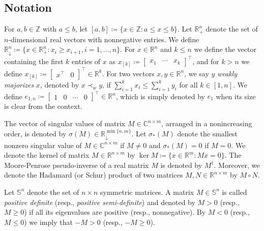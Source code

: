 \documentclass[pdflatex,sn-mathphys-num]{sn-jnl}%
\theoremstyle{thmstyleone}
\begin{document}
\subsection{Notation}


For $a,b\in\mathbb{Z}$ with $a\leq b$, let $[a,b]\coloneqq\{x\in\mathbb{Z}:a\leq x\leq b\}$. Let $\mathbb{R}_+^n$ denote the set of $n$-dimensional real vectors with nonnegative entries. We define \linebreak $\mathbb{R}^n_{\downarrow}\coloneqq\{x\in\mathbb{R}_+^n:x_i\geq x_{i+1},i=1,\ldots,n\}$. For $x\in\mathbb{R}^n$ and $k\leq n$ we define the vector containing the first $k$ entries of $x$ as $x_{[k]}\coloneqq\begin{bmatrix}
x_1 & \cdots & x_k
\end{bmatrix}^\top$, and for $k>n$ we define $x_{[k]}\coloneqq\begin{bmatrix}
x^\top & 0
\end{bmatrix}^\top\in\mathbb{R}^k$. For two vectors $x,y\in\mathbb{R}^n$, we say $y$ \emph{weakly majorizes} $x$, denoted by $x\prec_w y$, if $\sum_{i=1}^k x_i\leq \sum_{i=1}^k y_i$ for all $k\in[1,n]$. We define $e_{1,n}\coloneqq\begin{bmatrix}
1 & 0 & \cdots & 0
\end{bmatrix}^\top\in\mathbb{R}^n$, which is simply denoted by $e_1$ when its size is clear from the context.

The vector of singular values of matrix $M\in\mathbb{C}^{n\times m}$, arranged in a nonincreasing order, is denoted by $\sigma(M)\in\mathbb{R}^{\min\{n,m\}}_{\downarrow}$. Let $\sigma_*(M)$ denote the smallest nonzero singular value of $M\in\mathbb{C}^{n\times m}$ if $M\neq 0$ and $\sigma_*(M)=0$ if $M=0$. We denote the kernel of matrix $M\in\mathbb{R}^{n\times m}$ by $\ker M\coloneqq \{x\in\mathbb{R}^m:Mx=0\}$. The Moore-Penrose pseudo-inverse of a real matrix $M$ is denoted by $M^\dagger$. Moreover, we denote the Hadamard (or Schur) product of two matrices $M,N\in\mathbb{R}^{n\times m}$ by $M\circ N$. 

Let $\mathbb{S}^{n}$ denote the set of $n\times n$ symmetric matrices. A matrix $M\in\mathbb{S}^{n}$ is called \emph{positive definite} (resp., \emph{positive semi-definite}) and denoted by $M>0$ (resp., $M\geq 0$) if all its eigenvalues are positive (resp., nonnegative). By $M<0$ (resp., $M\leq 0$) we imply that $-M>0$ (resp., $-M\geq 0$).
\end{document}
